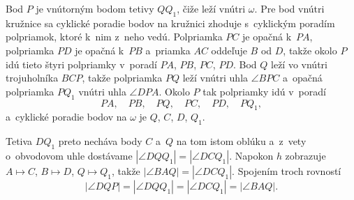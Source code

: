 {    Bod $P$ je vnútorným bodom tetivy $QQ_1$, čiže leží vnútri $\omega$. Pre bod vnútri kružnice sa cyklické poradie bodov na kružnici zhoduje s~cyklickým poradím polpriamok, ktoré k~nim z~neho vedú. Polpriamka $PC$ je opačná k~$PA$, polpriamka $PD$ je opačná k~$PB$ a~priamka $AC$ oddeľuje $B$ od $D$, takže okolo $P$ idú tieto štyri polpriamky v~poradí $PA$, $PB$, $PC$, $PD$. Bod $Q$ leží vo vnútri trojuholníka $BCP$, takže polpriamka $PQ$ leží vnútri uhla $\angle BPC$ a~opačná polpriamka $PQ_1$ vnútri uhla $\angle DPA$. Okolo $P$ tak polpriamky idú v~poradí
    $$
    PA, \quad PB, \quad PQ, \quad PC, \quad PD, \quad PQ_1,
    $$
    a~cyklické poradie bodov na $\omega$ je $Q$, $C$, $D$, $Q_1$.

    Tetiva $DQ_1$ preto necháva body $C$ a~$Q$ na tom istom oblúku a~z~vety o~obvodovom uhle dostávame $|\angle DQQ_1| = |\angle DCQ_1|$. Napokon $h$ zobrazuje $A \mapsto C$, $B \mapsto D$, $Q \mapsto Q_1$, takže $|\angle BAQ| = |\angle DCQ_1|$. Spojením troch rovností
    $$
    |\angle DQP| = |\angle DQQ_1| = |\angle DCQ_1| = |\angle BAQ|.
    $$
}

